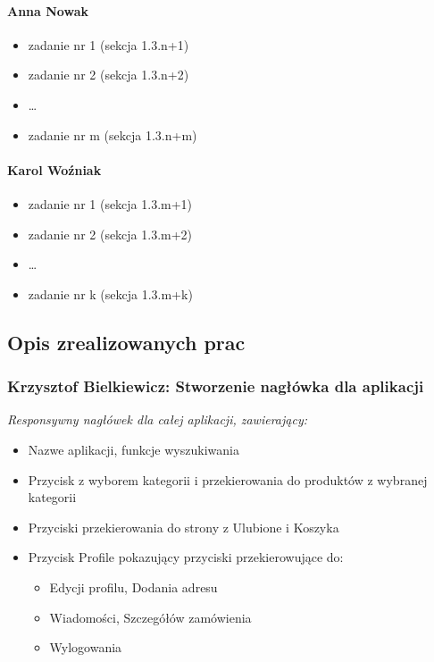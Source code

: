 \documentclass[12pt,a4paper,oneside]{article}
\theoremstyle{definition}
\numberwithin{equation}{section}
\begin{document}
\paragraph{Anna Nowak}
\begin{itemize}
\item zadanie nr 1 (sekcja 1.3.n+1)
\item zadanie nr 2 (sekcja 1.3.n+2)
\item \dots
\item zadanie nr m (sekcja 1.3.n+m)
\end{itemize}
\paragraph{Karol Woźniak}
\begin{itemize}
\item zadanie nr 1 (sekcja 1.3.m+1)
\item zadanie nr 2 (sekcja 1.3.m+2)
\item \dots
\item zadanie nr k (sekcja 1.3.m+k)

\end{itemize}

\subsection {Opis zrealizowanych prac}
\subsubsection{Krzysztof Bielkiewicz: Stworzenie nagłówka dla aplikacji}
\label{1.3.1}
\textit{Responsywny nagłówek dla całej aplikacji, zawierający:}
\begin{itemize}
    \item Nazwe aplikacji, funkcje wyszukiwania
    \item Przycisk z wyborem kategorii i przekierowania do produktów z wybranej kategorii
    \item Przyciski przekierowania do strony z Ulubione i Koszyka
    \item Przycisk Profile pokazujący przyciski przekierowujące do:
        \begin{itemize}
            \item Edycji profilu, Dodania adresu
            \item Wiadomości, Szczegółów zamówienia
            \item Wylogowania
        \end{itemize}
\end{itemize}
\end{document}
